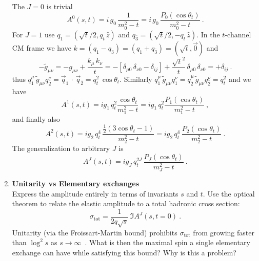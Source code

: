 \begin{enumerate}
\begin{solution}
              The $J=0$ is trivial
              \begin{equation}
                  A^0(s,t) = i \, g_0 \, \frac{1}{m_0^2 - t} = i \, g_0 \, \frac{P_0(\cos\theta_t)}{m_0^2 - t} ~.
              \end{equation}
              For $J=1$ use $q_1 = (\sqrt{t}/2, q_t \, \hat{z})$ and $q_{\bar{3}} = (\sqrt{t}/2, - q_t \, \hat{z} )$.
              In the $t$-channel CM frame we have $k = (q_1 - q_3) = (q_1 + q_{\bar{3}}) = (\sqrt{t}, \vec{0})$ and
              \begin{equation}
                  -\tilde{g}_{\mu\nu} =  - g_{\mu\nu} + \frac{k_\mu \, k_\nu}{t}
                  =  -\left[\delta_{\mu0} \, \delta_{\nu0} - \delta_{ij} \right] + \frac{\sqrt{t}^2}{t} \, \delta_{\mu0} \, \delta_{\nu0} = +\delta_{ij} ~.
              \end{equation}
              thus $q_1^\mu \, \tilde{g}_{\mu\nu} q_{\bar{2}}^\nu =  \vec{q}_1 \, \cdot \, \vec{q}_{\bar{2}} = q_t^2 \, \cos\theta_t$. Similarly $q_1^\mu \, \tilde{g}_{\mu\nu} q_{1}^\nu =  q_{\bar{2}}^\mu \, \tilde{g}_{\mu\nu} q_{\bar{2}}^\nu  = q_t^2$ and we have
              \begin{equation}
                  A^1(s,t) = i g_1 \, q_t^2 \frac{ \cos\theta_t}{m_1^2 - t} = i g_1 \, q_t^2 \frac{P_1(\cos\theta_t)}{m_1^2 - t} ~,
              \end{equation}
              and finally also
              \begin{equation}
                  A^2(s,t) = i g_2 \, q_t^4 \,\frac{\frac{1}{2}(3 \cos\theta_t - 1)}{m_2^2 - t} =  i g_2 \, q_t^4 \, \frac{ P_2(\cos\theta_t)}{m_2^2 - t} ~.
              \end{equation}
              The generalization to arbitrary $J$ is
              \begin{equation}
                  A^J(s,t) = ig_J \, q_t^{2J} \, \frac{ P_J(\cos\theta_t)}{m_J^2 - t} ~.
              \end{equation}
          \end{solution}

    \item \textbf{Unitarity vs Elementary exchanges} \\
          Express the amplitude entirely in terms of invariants $s$ and $t$. Use the optical theorem to relate the elastic amplitude to a total hadronic cross section:
          \begin{equation}
              \sigma_\text{tot} = \frac{1}{2q\sqrt{s}} \, \Im A^J(s,t=0)~.
          \end{equation}
          Unitarity (via the Froissart-Martin bound) prohibits $\sigma_\text{tot}$ from growing faster than $\log^2 s$ as $s\to\infty$~. What is then the maximal spin a single elementary exchange can have while satisfying this bound? Why is this a problem?


\end{enumerate}
